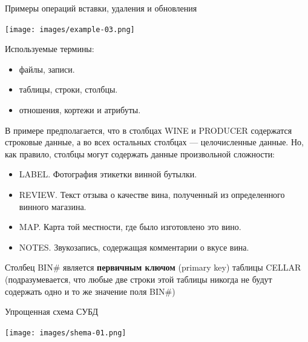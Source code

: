 \documentclass{beamer}
\begin{document}
\begin{frame}
\begin{block}{Примеры операций вставки, удаления и обновления}
\begin{center}
\texttt{[image: images/example-03.png]}
\end{center}
\end{block}
Используемые термины:
\begin{itemize}
\item файлы, записи.
\item таблицы, строки, столбцы.
\item отношения, кортежи и атрибуты.
\end{itemize}
\end{frame}

\begin{frame}
В примере предполагается, что в столбцах WINE и PRODUCER содержатся строковые данные, а во всех остальных столбцах — целочисленные данные. Но, как правило, столбцы могут содержать
данные произвольной сложности:
\begin{itemize}
\item LABEL. Фотография этикетки винной бутылки.
\item REVIEW. Текст отзыва о качестве вина, полученный из определенного винного
магазина.
\item MAP. Карта той местности, где было изготовлено это вино.
\item NOTES. Звукозапись, содержащая комментарии о вкусе вина.
\end{itemize}
Столбец BIN\# является \textbf{первичным ключом} (primary key) таблицы CELLAR (подразумевается, что любые две строки этой таблицы никогда не будут содержать одно и то же значение поля BIN\#)
\end{frame}

\begin{frame}
\begin{block}{Упрощенная схема СУБД}
\begin{center}
\texttt{[image: images/shema-01.png]}
\end{center}
\end{block}
\end{frame}
\end{document}
